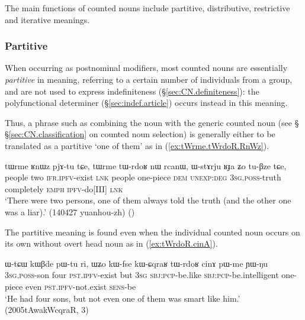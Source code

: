 The main functions of counted nouns include partitive, distributive, restrictive and iterative meanings.

\subsubsection{Partitive} \label{sec:CN.partitive}
When occurring as postnominal modifiers, most counted nouns are essentially \textit{partitive} in meaning, referring to a certain number of individuals from a group, and are not used to express indefiniteness (§\ref{sec:CN.definiteness}): the polyfunctional determiner   (§\ref{sec:indef.article}) occurs instead in this meaning.

Thus, a phrase such as   combining the noun  with the generic counted noun  (see § §\ref{sec:CN.classification} on counted noun selection) is generally either to be translated as a partitive `one of them'  as in (\ref{ex:tWrme.tWrdoR.RnWz}).

\begin{exe}
	\ex \label{ex:tWrme.tWrdoR.RnWz}
	\gll tɯrme ʁnɯz pjɤ-tu tɕe, tɯrme tɯ-rdoʁ nɯ rcanɯ, ɯ-stɤrju ʁɟa ʑo tu-βze tɕe, \\
	people two \textsc{ifr}.\textsc{ipfv}-exist \textsc{lnk} people one-piece \textsc{dem} \textsc{unexp}:\textsc{deg} \textsc{3sg}.\textsc{poss}-truth completely \textsc{emph} \textsc{ipfv}-do[III] \textsc{lnk} \\
	\glt `There were two persons, one of them always told the truth (and the other one was a liar).' (140427 yuanhou-zh)
()
\end{exe} 

The partitive meaning is found even when the individual counted noun occurs on its own without overt head noun as in (\ref{ex:tWrdoR.cinA}).

\begin{exe}
	\ex \label{ex:tWrdoR.cinA}
	\gll ɯ-tɕɯ kɯβde pɯ-tu ri, ɯʑo kɯ-fse kɯ-ɕqraʁ tɯ-rdoʁ cinɤ pɯ-me ɲɯ-ŋu 	\\
	\textsc{3sg}.\textsc{poss}-son four \textsc{pst}.\textsc{ipfv}-exist but \textsc{3sg} \textsc{sbj}:\textsc{pcp}-be.like \textsc{sbj}:\textsc{pcp}-be.intelligent one-piece even \textsc{pst}.\textsc{ipfv}-not.exist \textsc{sens}-be \\
	\glt `He had four sons, but not even one of them was smart like him.' (2005tAwakWcqraR, 3)
\end{exe} 


